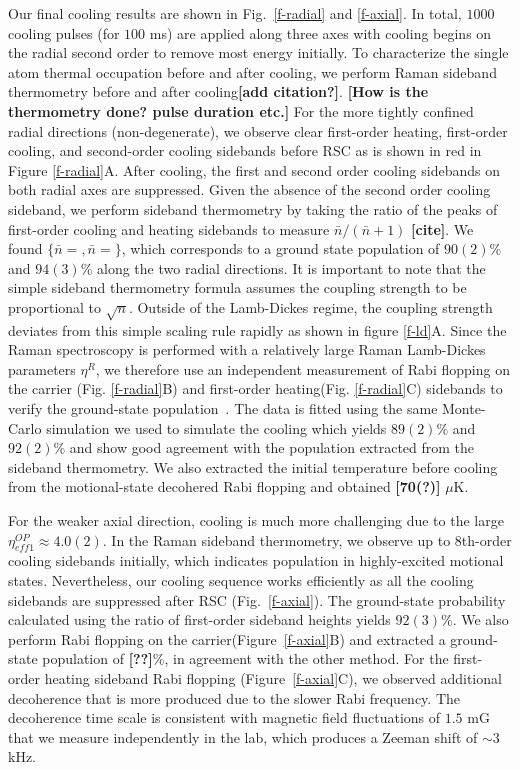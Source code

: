 \documentclass[aps,prl,twocolumn,groupedaddress]{revtex4-1}
\newcommand{\fxnote}[1]{{\textbf{[#1]}}}
\begin{document}
Our final cooling results are shown in Fig.~\ref{f-radial} and \ref{f-axial}.
In total, $1000$ cooling pulses (for $100$ ms) are applied along three axes with
cooling begins on the radial second order to remove most energy initially.
To characterize the single atom thermal occupation before and after cooling,
we perform Raman sideband thermometry before and after cooling\fxnote{add citation?}.
\fxnote{How is the thermometry done? pulse duration etc.}
For the more tightly confined radial directions (non-degenerate),
we observe clear first-order heating, first-order cooling,
and second-order cooling sidebands before RSC as is shown in red in Figure \ref{f-radial}A.
After cooling, the first and second order cooling sidebands on both radial axes are suppressed.
Given the absence of the second order cooling sideband, we perform sideband thermometry
by taking the ratio of the peaks of first-order cooling and heating sidebands to measure $\bar n / (\bar n + 1)$ \fxnote{cite}.
We found $\{\bar n =,\bar n =\}$, which corresponds to a ground state population of $90(2)\%$
and $94(3)\%$ along the two radial directions.
It is important to note that the simple sideband thermometry formula assumes the coupling strength
to be proportional to $\sqrt{n}$. Outside of the Lamb-Dickes regime,
the coupling strength deviates from this simple scaling rule rapidly
as shown in figure \ref{f-ld}A. Since the Raman spectroscopy is performed
with a relatively large Raman Lamb-Dickes parameters $\eta^R$,
we therefore use an independent measurement of Rabi flopping on the carrier (Fig. \ref{f-radial}B)
and first-order heating(Fig. \ref{f-radial}C) sidebands
to verify the ground-state population~\cite{Meekhof1996}.
The data is fitted using the same Monte-Carlo simulation we used to simulate the cooling
which yields $89(2)\%$ and $92(2)\%$ and show good agreement with
the population extracted from the sideband thermometry.
We also extracted the initial temperature before cooling
from the motional-state decohered Rabi flopping and obtained \fxnote{70(?)} $\mu$K.

For the weaker axial direction, cooling is much more challenging
due to the large $\eta^{OP}_{eff1}\approx 4.0(2)$.
In the Raman sideband thermometry, we observe up to 8th-order cooling sidebands initially,
which indicates population in highly-excited motional states.
Nevertheless, our cooling sequence works efficiently as all the cooling sidebands are suppressed
after RSC (Fig.~\ref{f-axial}).
The ground-state probability calculated using the ratio of first-order sideband heights yields
$92(3)\%$. We also perform Rabi flopping on the carrier(Figure~\ref{f-axial}B)
and extracted a ground-state population of \fxnote{??}\%, in agreement with the other method.
For the first-order heating sideband Rabi flopping (Figure~\ref{f-axial}C),
we observed additional decoherence that is more produced due to the slower Rabi frequency.
The decoherence time scale is consistent with magnetic field fluctuations of $1.5$ mG
that we measure independently in the lab, which produces a Zeeman shift of $\sim 3$ kHz.
\end{document}
